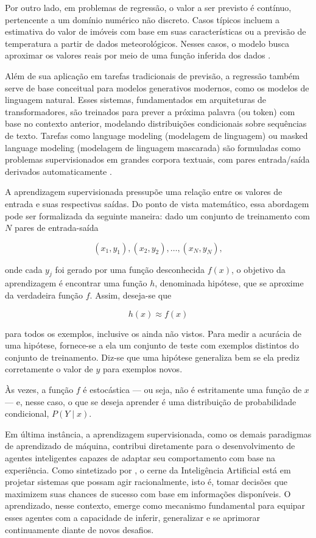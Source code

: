 Por outro lado, em problemas de regressão, o valor a ser previsto é contínuo, pertencente a um domínio numérico não discreto. Casos típicos incluem a estimativa do valor de imóveis com base em suas características ou a previsão de temperatura a partir de dados meteorológicos. Nesses casos, o modelo busca aproximar os valores reais por meio de uma função inferida dos dados \cite{hastie_elements_2009}.

Além de sua aplicação em tarefas tradicionais de previsão, a regressão também serve de base conceitual para modelos generativos modernos, como os modelos de linguagem natural. Esses sistemas, fundamentados em arquiteturas de transformadores, são treinados para prever a próxima palavra (ou token) com base no contexto anterior, modelando distribuições condicionais sobre sequências de texto. Tarefas como language modeling (modelagem de linguagem) ou masked language modeling (modelagem de linguagem mascarada) são formuladas como problemas supervisionados em grandes corpora textuais, com pares entrada/saída derivados automaticamente \cite{devlin_bert:_2018}.

A aprendizagem supervisionada pressupõe uma relação entre os valores de entrada e suas respectivas saídas. Do ponto de vista matemático, essa abordagem pode ser formalizada da seguinte maneira: dado um conjunto de treinamento com \( N \) pares de entrada-saída

\[
(x_1, y_1), (x_2, y_2), \dots, (x_N, y_N),
\]

onde cada \( y_j \) foi gerado por uma função desconhecida \( f(x) \), o objetivo da aprendizagem é encontrar uma função \( h \), denominada hipótese, que se aproxime da verdadeira função \( f \). Assim, deseja-se que

\[
h(x) \approx f(x)
\]

para todos os exemplos, inclusive os ainda não vistos. Para medir a acurácia de uma hipótese, fornece-se a ela um conjunto de teste com exemplos distintos do conjunto de treinamento. Diz-se que uma hipótese generaliza bem se ela prediz corretamente o valor de \( y \) para exemplos novos. 

Às vezes, a função \( f \) é estocástica — ou seja, não é estritamente uma função de \( x \) — e, nesse caso, o que se deseja aprender é uma distribuição de probabilidade condicional, \( P(Y \mid x) \).

Em última instância, a aprendizagem supervisionada, como os demais paradigmas de aprendizado de máquina, contribui diretamente para o desenvolvimento de agentes inteligentes capazes de adaptar seu comportamento com base na experiência. Como sintetizado por , o cerne da Inteligência Artificial está em projetar sistemas que possam agir racionalmente, isto é, tomar decisões que maximizem suas chances de sucesso com base em informações disponíveis. O aprendizado, nesse contexto, emerge como mecanismo fundamental para equipar esses agentes com a capacidade de inferir, generalizar e se aprimorar continuamente diante de novos desafios.

